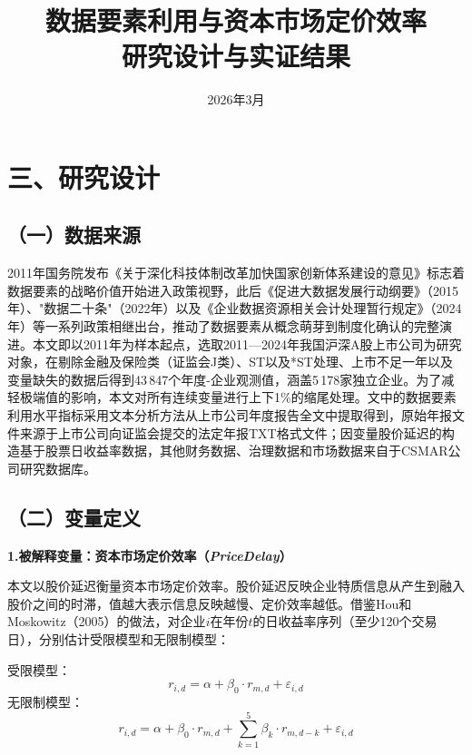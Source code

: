 \documentclass[11pt,a4paper]{article}
\title{{\hei\Large 数据要素利用与资本市场定价效率} \\[8pt]
{\large 研究设计与实证结果}}
\author{}
\date{2026年3月}
\begin{document}
\maketitle
\thispagestyle{fancy}


\section*{三、研究设计}

\subsection*{（一）数据来源}

2011年国务院发布《关于深化科技体制改革加快国家创新体系建设的意见》标志着数据要素的战略价值开始进入政策视野，此后《促进大数据发展行动纲要》（2015年）、"数据二十条"（2022年）以及《企业数据资源相关会计处理暂行规定》（2024年）等一系列政策相继出台，推动了数据要素从概念萌芽到制度化确认的完整演进。本文即以2011年为样本起点，选取2011---2024年我国沪深A股上市公司为研究对象，在剔除金融及保险类（证监会J类）、ST以及*ST处理、上市不足一年以及变量缺失的数据后得到43\,847个年度-企业观测值，涵盖5\,178家独立企业。为了减轻极端值的影响，本文对所有连续变量进行上下1\%的缩尾处理。文中的数据要素利用水平指标采用文本分析方法从上市公司年度报告全文中提取得到，原始年报文件来源于上市公司向证监会提交的法定年报TXT格式文件；因变量股价延迟的构造基于股票日收益率数据，其他财务数据、治理数据和市场数据来自于CSMAR公司研究数据库。

\subsection*{（二）变量定义}

\noindent\textbf{1.\hspace{0.5em}被解释变量：资本市场定价效率（\textit{PriceDelay}）}

\vspace{2pt}

本文以股价延迟衡量资本市场定价效率。股价延迟反映企业特质信息从产生到融入股价之间的时滞，值越大表示信息反映越慢、定价效率越低。借鉴Hou和Moskowitz（2005）的做法，对企业$i$在年份$t$的日收益率序列（至少120个交易日），分别估计受限模型和无限制模型：

受限模型：
\vspace{-6pt}
\[ r_{i,d} = \alpha + \beta_0 \cdot r_{m,d} + \varepsilon_{i,d} \]
\vspace{-6pt}
无限制模型：
\vspace{-6pt}
\[ r_{i,d} = \alpha + \beta_0 \cdot r_{m,d} + \sum_{k=1}^{5}\beta_k \cdot r_{m,d-k} + \varepsilon_{i,d} \]
\vspace{-6pt}
\end{document}
